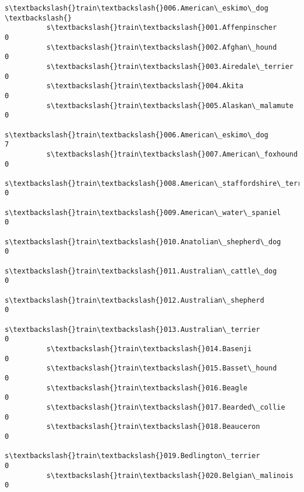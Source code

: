\documentclass[11pt]{article}
\begin{document}
\begin{Verbatim}[commandchars=\\\{\}]
                                                          s\textbackslash{}train\textbackslash{}006.American\_eskimo\_dog  \textbackslash{}
          s\textbackslash{}train\textbackslash{}001.Affenpinscher                                                     0   
          s\textbackslash{}train\textbackslash{}002.Afghan\_hound                                                      0   
          s\textbackslash{}train\textbackslash{}003.Airedale\_terrier                                                  0   
          s\textbackslash{}train\textbackslash{}004.Akita                                                             0   
          s\textbackslash{}train\textbackslash{}005.Alaskan\_malamute                                                  0   
          s\textbackslash{}train\textbackslash{}006.American\_eskimo\_dog                                               7   
          s\textbackslash{}train\textbackslash{}007.American\_foxhound                                                 0   
          s\textbackslash{}train\textbackslash{}008.American\_staffordshire\_terrier                                    0   
          s\textbackslash{}train\textbackslash{}009.American\_water\_spaniel                                            0   
          s\textbackslash{}train\textbackslash{}010.Anatolian\_shepherd\_dog                                            0   
          s\textbackslash{}train\textbackslash{}011.Australian\_cattle\_dog                                             0   
          s\textbackslash{}train\textbackslash{}012.Australian\_shepherd                                               0   
          s\textbackslash{}train\textbackslash{}013.Australian\_terrier                                                0   
          s\textbackslash{}train\textbackslash{}014.Basenji                                                           0   
          s\textbackslash{}train\textbackslash{}015.Basset\_hound                                                      0   
          s\textbackslash{}train\textbackslash{}016.Beagle                                                            0   
          s\textbackslash{}train\textbackslash{}017.Bearded\_collie                                                    0   
          s\textbackslash{}train\textbackslash{}018.Beauceron                                                         0   
          s\textbackslash{}train\textbackslash{}019.Bedlington\_terrier                                                0   
          s\textbackslash{}train\textbackslash{}020.Belgian\_malinois                                                  0   

\end{Verbatim}
\end{document}
